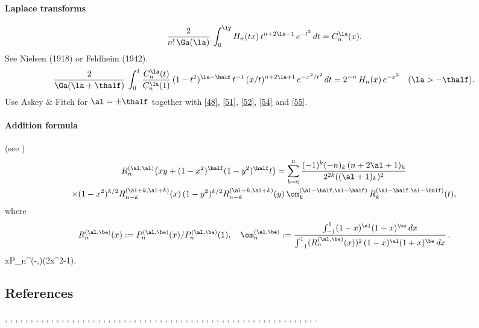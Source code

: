 \documentclass[envcountchap,graybox]{svmono}
\begin{document}
\paragraph{Laplace transforms}
\begin{equation}
\frac2{n!\,\Ga(\la)}\,
\int_0^\iy H_n(tx)\,t^{n+2\la-1}\,e^{-t^2}\,dt=C_n^\la(x).
\label{56}
\end{equation}
See Nielsen \cite[p.48, (4) with p.47, (1) and p.28, (10)]{K4} (1918)
or Feldheim \cite[(28)]{K3} (1942).
\begin{equation}
\frac2{\Ga(\la+\thalf)}\,\int_0^1 \frac{C_n^\la(t)}{C_n^\la(1)}\,
(1-t^2)^{\la-\half}\,t^{-1}\,(x/t)^{n+2\la+1}\,e^{-x^2/t^2}\,dt
=2^{-n}\,H_n(x)\,e^{-x^2}\quad(\la>-\thalf).
\label{46}
\end{equation}
Use Askey \& Fitch \cite[(3.29)]{K2} for $\al=\pm\thalf$ together with
\eqref{48}, \eqref{51}, \eqref{52}, \eqref{54} and \eqref{55}.
\paragraph{Addition formula} (see \mycite{AAR}{(9.8.5$'$)]})
\begin{multline}
R_n^{(\al,\al)}\big(xy+(1-x^2)^\half(1-y^2)^\half t\big)
=\sum_{k=0}^n \frac{(-1)^k(-n)_k\,(n+2\al+1)_k}{2^{2k}((\al+1)_k)^2}\\
\times(1-x^2)^{k/2} R_{n-k}^{(\al+k,\al+k)}(x)\,(1-y^2)^{k/2} R_{n-k}^{(\al+k,\al+k)}(y)\,
\om_k^{(\al-\half,\al-\half)}\,R_k^{(\al-\half,\al-\half)}(t),
\label{108}
\end{multline}
where
\[
R_n^{(\al,\be)}(x):=P_n^{(\al,\be)}(x)/P_n^{(\al,\be)}(1),\quad
\om_n^{(\al,\be)}:=\frac{\int_{-1}^1 (1-x)^\al(1+x)^\be\,dx}
{\int_{-1}^1 (R_n^{(\al,\be)}(x))^2\,(1-x)^\al(1+x)^\be\,dx}\,.
\]
xP_n^{(\lambda-,)}(2x^2-1).$$

\subsection*{References}
\cite{Abram}, \cite{Ahmed+86}, \cite{AndrewsAskeyRoy}, \cite{Area+I}, \cite{Askey67}, \cite{Askey74}, \cite{Askey75},
\cite{Askey89I}, \cite{AskeyFitch}, \cite{AskeyKoornRahman}, \cite{Berg}, \cite{BilodeauI},
\cite{BojanovNikolov}, \cite{Brafman51}, \cite{Brafman57I}, \cite{Brown},
\cite{BustozIsmail82}, \cite{BustozIsmail83}, \cite{BustozIsmail89}, \cite{BustozSavage79},
\cite{BustozSavage80}, \cite{Carlitz61II}, \cite{Chihara78}, \cite{Common}, \cite{Danese},
\cite{Dette94}, \cite{DijksmaKoorn}, \cite{DilcherStolarsky}, \cite{Dimitrov96},
\cite{Dimitrov2003}, \cite{Doha2002II}, \cite{Driver}, \cite{ElbertLaforgia86I},
\cite{ElbertLaforgia86II}, \cite{ElbertLaforgia90}, \cite{Erdelyi+}, \cite{Exton96},
\cite{Gasper69}, \cite{Gasper72II}, \cite{Gasper85}, \cite{Grad}, \cite{Ismail74},
\cite{Ismail2005II}, \cite{Koekoek2000}, \cite{Koorn88}, \cite{Laforgia}, \cite{LewanowiczI},
\cite{Lorch}, \cite{Mathai}, \cite{Nagel}, \cite{Nikiforov+}, \cite{NikiforovUvarov},
\cite{RahmanShah}, \cite{Rainville}, \cite{Reimer}, \cite{Sartoretto}, \cite{Srivastava71},
\cite{Szego75}, \cite{Temme}, \cite{Viswanathan}, \cite{Zayed}.
\end{document}
